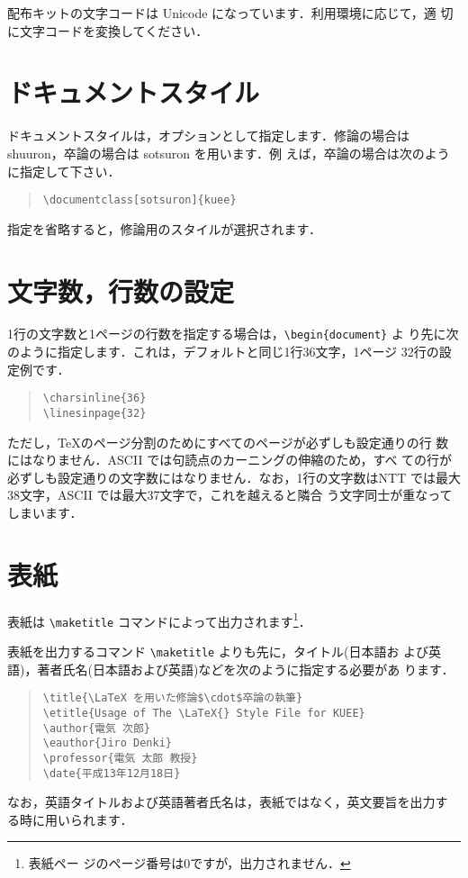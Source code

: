 \documentclass[sotsuron]{kuee}
\begin{document}
配布キットの文字コードは Unicode になっています．利用環境に応じて，適
切に文字コードを変換してください．


\section{ドキュメントスタイル}

ドキュメントスタイルは，オプションとして指定します．修論の場合は
{\ttfamily shuuron}，卒論の場合は {\ttfamily sotsuron} を用います．例
えば，卒論の場合は次のように指定して下さい．
\begin{quote}
  \begin{verbatim}
\documentclass[sotsuron]{kuee}
\end{verbatim}
\end{quote}
指定を省略すると，修論用のスタイルが選択されます．


\section{文字数，行数の設定}

1行の文字数と1ページの行数を指定する場合は，\verb+\begin{document}+ よ
り先に次のように指定します．これは，デフォルトと同じ1行36文字，1ページ
32行の設定例です．
\begin{quote}
  \begin{verbatim}
\charsinline{36}
\linesinpage{32}
\end{verbatim}
\end{quote}
ただし，\TeX のページ分割のためにすべてのページが必ずしも設定通りの行
数にはなりません．ASCII \JTeX では句読点のカーニングの伸縮のため，すべ
ての行が必ずしも設定通りの文字数にはなりません．なお，1行の文字数はNTT
\JTeX では最大38文字，ASCII \JTeX では最大37文字で，これを越えると隣合
う文字同士が重なってしまいます．


\section{表紙}
表紙は \verb+\maketitle+ コマンドによって出力されます\footnote{表紙ペー
  ジのページ番号は0ですが，出力されません．}．

表紙を出力するコマンド \verb+\maketitle+ よりも先に，タイトル(日本語お
よび英語)，著者氏名(日本語および英語)などを次のように指定する必要があ
ります．
\begin{quote}
  \begin{verbatim}
\title{\LaTeX を用いた修論$\cdot$卒論の執筆}
\etitle{Usage of The \LaTeX{} Style File for KUEE}
\author{電気 次郎}
\eauthor{Jiro Denki}
\professor{電気 太郎 教授}
\date{平成13年12月18日}
\end{verbatim}
\end{quote}
なお，英語タイトルおよび英語著者氏名は，表紙ではなく，英文要旨を出力す
る時に用いられます．
\end{document}
